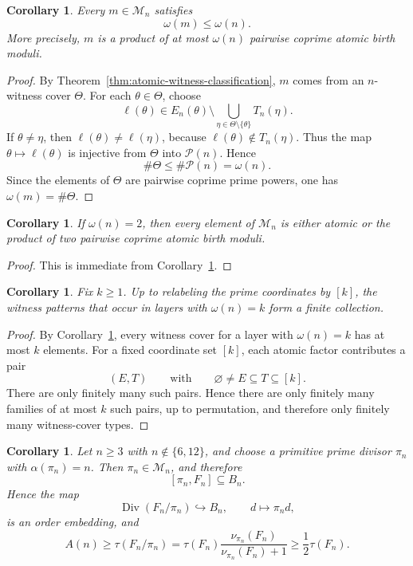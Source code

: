 \documentclass[11pt,letterpaper]{article}
\numberwithin{equation}{section}
\theoremstyle{plain}
\newtheorem{corollary}[theorem]{Corollary}
\theoremstyle{definition}
\theoremstyle{remark}
\begin{document}
\begin{corollary}
\label{cor:minimal-generator-support-bound}
Every $m\in\mathcal M_n$ satisfies
\[
\omega(m)\le \omega(n).
\]
More precisely, $m$ is a product of at most $\omega(n)$ pairwise coprime atomic
birth moduli.
\end{corollary}

\begin{proof}
By Theorem~\ref{thm:atomic-witness-classification}, $m$ comes from an
$n$-witness cover $\Theta$. For each $\theta\in\Theta$, choose
\[
\ell(\theta)\in E_n(\theta)\setminus
\bigcup_{\eta\in\Theta\setminus\{\theta\}}T_n(\eta).
\]
If $\theta\neq \eta$, then $\ell(\theta)\neq \ell(\eta)$, because
$\ell(\theta)\notin T_n(\eta)$. Thus the map $\theta\mapsto \ell(\theta)$ is
injective from $\Theta$ into $\mathcal P(n)$. Hence
\[
\#\Theta\le \#\mathcal P(n)=\omega(n).
\]
Since the elements of $\Theta$ are pairwise coprime prime powers, one has
$\omega(m)=\#\Theta$.
\end{proof}

\begin{corollary}
\label{cor:two-support-binary}
If $\omega(n)=2$, then every element of $\mathcal M_n$ is either atomic or the
product of two pairwise coprime atomic birth moduli.
\end{corollary}

\begin{proof}
This is immediate from Corollary~\ref{cor:minimal-generator-support-bound}.
\end{proof}

\begin{corollary}
\label{cor:witness-cover-finite-type}
Fix $k\ge 1$. Up to relabeling the prime coordinates by $[k]$, the witness
patterns that occur in layers with $\omega(n)=k$ form a finite collection.
\end{corollary}

\begin{proof}
By Corollary~\ref{cor:minimal-generator-support-bound}, every witness cover for
a layer with $\omega(n)=k$ has at most $k$ elements. For a fixed coordinate set
$[k]$, each atomic factor contributes a pair
\[
(E,T)
\qquad\text{with}\qquad
\varnothing\neq E\subseteq T\subseteq [k].
\]
There are only finitely many such pairs. Hence there are only finitely many
families of at most $k$ such pairs, up to permutation, and therefore only
finitely many witness-cover types.
\end{proof}

\begin{corollary}
\label{thm:canonical-principal-interval}
Let $n\ge 3$ with $n\notin\{6,12\}$, and choose a primitive prime divisor
$\pi_n$ with $\alpha(\pi_n)=n$. Then $\pi_n\in \mathcal M_n$, and therefore
\[
[\pi_n,F_n]\subseteq B_n.
\]
Hence the map
\[
\operatorname{Div}(F_n/\pi_n)\hookrightarrow B_n,
\qquad
d\longmapsto \pi_n d,
\]
is an order embedding, and
\[
A(n)\ge \tau(F_n/\pi_n)
=\tau(F_n)\frac{\nu_{\pi_n}(F_n)}{\nu_{\pi_n}(F_n)+1}
\ge \frac12\tau(F_n).
\]
\end{corollary}
\end{document}
